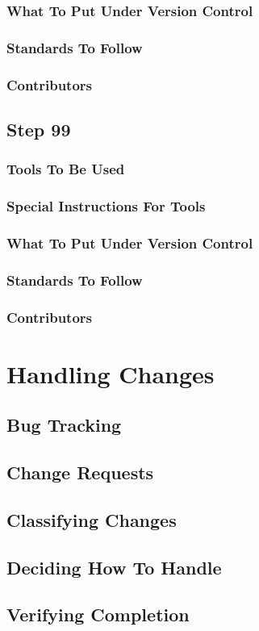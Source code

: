 \documentclass[12pt, titlepage]{article}
\begin{document}
\subsubsection*{What To Put Under Version Control}
\subsubsection*{Standards To Follow}
\subsubsection*{Contributors}

\subsection{Step 99}
\subsubsection*{Tools To Be Used}
\subsubsection*{Special Instructions For Tools}
\subsubsection*{What To Put Under Version Control}
\subsubsection*{Standards To Follow}
\subsubsection*{Contributors}

\section{Handling Changes}
\subsection{Bug Tracking}
\subsection{Change Requests}
\subsection{Classifying Changes}
\subsection{Deciding How To Handle}
\subsection{Verifying Completion}




% 
% 
\end{document}
